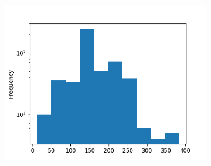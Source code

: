 \begin{figure}[!ht]
    \vspace{5mm}

    \begin{subfigure}[!ht]{.5\linewidth}
        \centering
        \includegraphics[width=\textwidth]{./img/monthly-work-targets.png}
    \end{subfigure}
\end{figure}


